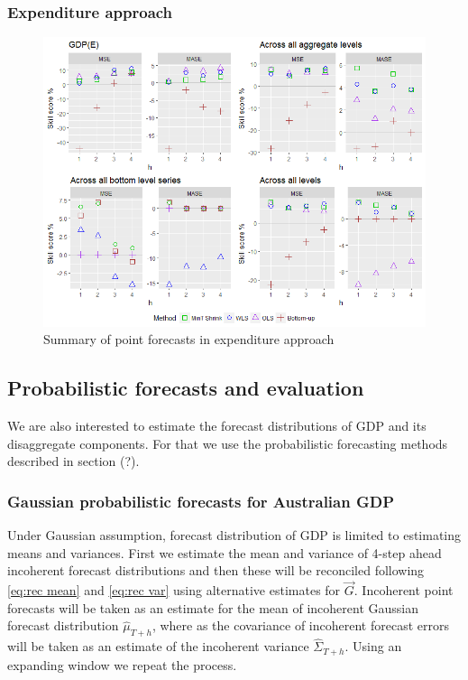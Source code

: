 \documentclass[graybox]{svmult}
\begin{document}
\subsubsection*{Expenditure approach}

\begin{figure}[H]
	\centering
	\small
	\includegraphics[scale=0.50]{Figs/Results/EXP-PointF.png}
	\caption{Summary of point forecasts in expenditure approach}\label{Inc-PointF}
\end{figure}




\subsection{Probabilistic forecasts and evaluation}

We are also interested to estimate the forecast distributions of GDP and its disaggregate components. For that we use the probabilistic forecasting methods described in section (?).

\subsubsection{Gaussian probabilistic forecasts for Australian GDP}

Under Gaussian assumption, forecast distribution of GDP is limited to estimating means and variances. First we estimate the mean and variance of 4-step ahead incoherent forecast distributions and then these will be reconciled following \ref{eq:rec mean} and \ref{eq:rec var} using alternative estimates for $\vec{G}$. Incoherent point forecasts will be taken as an estimate for the mean of incoherent Gaussian forecast distribution $\hat{\mu}_{T+h}$, where as the covariance of incoherent forecast errors will be taken as an estimate of the incoherent variance $\hat{\Sigma}_{T+h}$. Using an expanding window we repeat the process.
\end{document}

